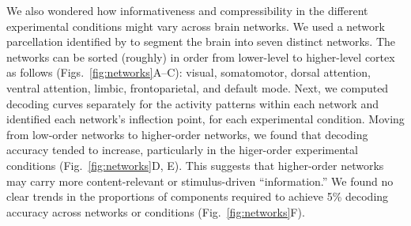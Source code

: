 \documentclass[english, 11pt]{article}
\begin{document}
We also wondered how informativeness and compressibility in the different
experimental conditions might vary across brain networks. We used a network
parcellation identified by \cite{YeoEtal11} to segment the brain into seven
distinct networks. The networks can be sorted (roughly) in order from
lower-level to higher-level cortex as follows (Figs.~\ref{fig:networks}A--C):
visual, somatomotor, dorsal attention, ventral attention, limbic,
frontoparietal, and default mode. Next, we computed decoding curves separately
for the activity patterns within each network and identified each network's
inflection point, for each experimental condition. Moving from low-order
networks to higher-order networks, we found that decoding accuracy tended to
increase, particularly in the higer-order experimental conditions
(Fig.~\ref{fig:networks}D, E). This suggests that higher-order networks may
carry more content-relevant or stimulus-driven ``information.'' We found no
clear trends in the proportions of components required to achieve 5\% decoding
accuracy across networks or conditions (Fig.~\ref{fig:networks}F).
\end{document}
